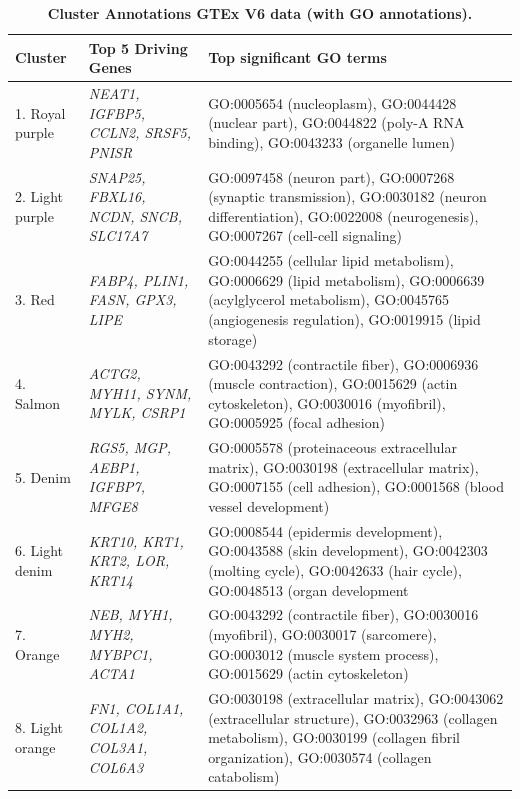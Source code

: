 \documentclass[10pt,letterpaper]{article}
\begin{document}
\clearpage
\begin{table}[!hp]
\begin{adjustwidth}{-2in}{0in} %
\footnotesize
\centering
\caption{\bf Cluster Annotations GTEx V6 data (with GO annotations).}
\renewcommand{\arraystretch}{1.7}
\begin{tabular}{|p{1.0in}|p{1.5in}|p{4.3in}|}
\hline
Cluster & Top 5 Driving \qquad Genes  &  Top significant GO terms \\
\hline
1. Royal purple & \textit{NEAT1, IGFBP5, CCLN2, SRSF5, PNISR} & GO:0005654 (nucleoplasm), GO:0044428 (nuclear part), GO:0044822 (poly-A RNA binding), GO:0043233 (organelle lumen)  \\ \hline
2. Light purple & \textit{SNAP25, FBXL16, NCDN, SNCB, SLC17A7} & GO:0097458 (neuron part), GO:0007268 (synaptic transmission), GO:0030182 (neuron differentiation), GO:0022008 (neurogenesis), GO:0007267 (cell-cell signaling) \\ \hline
3. Red & \textit{FABP4, PLIN1, FASN, GPX3, LIPE} & GO:0044255 (cellular lipid metabolism), GO:0006629 (lipid metabolism), GO:0006639 (acylglycerol metabolism), GO:0045765 (angiogenesis regulation), GO:0019915 (lipid storage) \\ \hline
4. Salmon & \textit{ACTG2, MYH11, SYNM, MYLK, CSRP1} & GO:0043292 (contractile fiber), GO:0006936 (muscle contraction), GO:0015629 (actin cytoskeleton), GO:0030016 (myofibril), GO:0005925 (focal adhesion) \\ \hline
5. Denim & \textit{RGS5, MGP,  AEBP1, IGFBP7, MFGE8} & GO:0005578 (proteinaceous extracellular matrix), GO:0030198 (extracellular matrix), GO:0007155 (cell adhesion), GO:0001568 (blood vessel development) \\ \hline
6. Light denim & \textit{KRT10, KRT1, KRT2, LOR, KRT14} & GO:0008544 (epidermis development), GO:0043588 (skin development), GO:0042303 (molting cycle), GO:0042633 (hair cycle), GO:0048513 (organ development \\ \hline
7. Orange & \textit{NEB, MYH1, MYH2, MYBPC1, ACTA1} & GO:0043292 (contractile fiber), GO:0030016 (myofibril), GO:0030017 (sarcomere), GO:0003012 (muscle system process), GO:0015629 (actin cytoskeleton) \\ \hline
8. Light orange & \textit{FN1, COL1A1, COL1A2, COL3A1, COL6A3} & GO:0030198 (extracellular matrix), GO:0043062 (extracellular structure), GO:0032963 (collagen metabolism), GO:0030199 (collagen fibril organization), GO:0030574 (collagen catabolism) \\ \hline

\end{tabular}
\end{adjustwidth}
\end{table}
\end{document}
